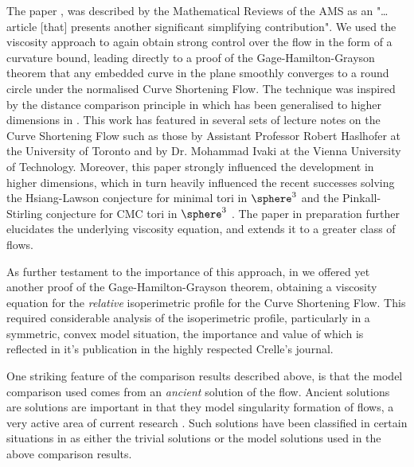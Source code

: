\documentclass[12pt]{amsart}
\begin{document}
The paper \cite{MR2794630}, was described by the Mathematical Reviews of the AMS as an "\ldots{}article [that] presents another significant simplifying contribution". We used the viscosity approach to again obtain strong control over the flow in the form of a curvature bound, leading directly to a proof of the Gage-Hamilton-Grayson theorem \cite{MR840401,MR906392} that any embedded curve in the plane smoothly converges to a round circle under the normalised Curve Shortening Flow. The technique was inspired by the distance comparison principle in \cite{MR1656553} which has been generalised to higher dimensions in \cite{MR2967056,MR3011290}. This work has featured in several sets of lecture notes on the Curve Shortening Flow such as those by Assistant Professor Robert Haslhofer at the University of Toronto and by Dr. Mohammad Ivaki at the Vienna University of Technology. Moreover, this paper strongly influenced the development in higher dimensions, which in turn heavily influenced the recent successes solving the Hsiang-Lawson conjecture \cite{MR3143888} for minimal tori in $\sphere^3$ and the Pinkall-Stirling conjecture for CMC tori in $\sphere^3$ \cite{2012arXiv1204.5007A}. The paper \cite{alpha_csf_dist_comp} in preparation further elucidates the underlying viscosity equation, and extends it to a greater class of flows.

As further testament to the importance of this approach, in \cite{MR2843240} we offered yet another proof of the Gage-Hamilton-Grayson theorem, obtaining a viscosity equation for the \emph{relative} isoperimetric profile for the Curve Shortening Flow. This required considerable analysis of the isoperimetric profile, particularly in a symmetric, convex model situation, the importance and value of which is reflected in it's publication in the highly respected Crelle's journal.

One striking feature of the comparison results described above, is that the model comparison used comes from an \emph{ancient} solution of the flow. Ancient solutions are solutions are important in that they model singularity formation of flows, a very active area of current research \cite{MR3020169,MR2993752}. Such solutions have been classified in certain situations in \cite{MR2669361, MR2971286} as either the trivial solutions or the model solutions used in the above comparison results.
\end{document}
